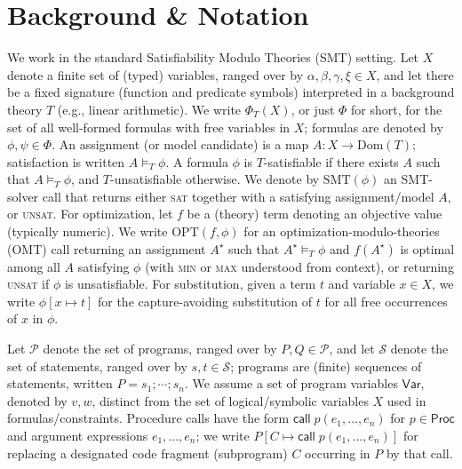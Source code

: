 \documentclass[acmsmall]{acmart}
\theoremstyle{definition}
\begin{document}
\section{Background \& Notation}

We work in the standard Satisfiability Modulo Theories (SMT) setting. Let $X$ denote a finite set of (typed) variables, ranged over by $\alpha,\beta,\gamma,\xi\in X$, and let there be a fixed signature (function and predicate symbols) interpreted in a background theory $T$ (e.g., linear arithmetic).
We write $\Phi_{T}(X)$, or just $\Phi$ for short, for the set of all well-formed formulas with free variables in $X$; formulas are denoted by $\phi,\psi\in \Phi$.
An assignment (or model candidate) is a map $A: X \to \mathrm{Dom}(T)$; satisfaction is written $A \models_T \phi$.
A formula $\phi$ is $T$-satisfiable if there exists $A$ such that $A \models_T \phi$, and $T$-unsatisfiable otherwise.
We denote by $\mathrm{SMT}(\phi)$ an SMT-solver call that returns either \textsc{sat} together with a satisfying assignment/model $A$, or \textsc{unsat}.
For optimization, let $f$ be a (theory) term denoting an objective value (typically numeric). We write $\mathrm{OPT}(f,\phi)$ for an optimization-modulo-theories (OMT) call returning an assignment $A^\star$ such that $A^\star \models_T \phi$ and $f(A^\star)$ is optimal among all $A$ satisfying $\phi$ (with \textsc{min} or \textsc{max} understood from context), or returning \textsc{unsat} if $\phi$ is unsatisfiable.
For substitution, given a term $t$ and variable $x\in X$, we write $\phi[x\mapsto t]$ for the capture-avoiding substitution of $t$ for all free occurrences of $x$ in $\phi$.

Let $\mathcal{P}$ denote the set of programs, ranged over by $P,Q\in\mathcal{P}$, and let $\mathcal{S}$ denote the set of statements, ranged over by $s,t\in\mathcal{S}$; programs are (finite) sequences of statements, written $P = s_1;\cdots;s_n$. We assume a set of program variables $\mathsf{Var}$, denoted by $v,w$, distinct from the set of logical/symbolic variables $X$ used in formulas/constraints. Procedure calls have the form $\mathsf{call}\;p(e_1, ..., e_n)$ for $p\in\mathsf{Proc}$ and argument expressions $e_1, ..., e_n$; we write $P[C \mapsto \mathsf{call}\;p(e_1, ..., e_n)]$ for replacing a designated code fragment (subprogram) $C$ occurring in $P$ by that call.
\end{document}
